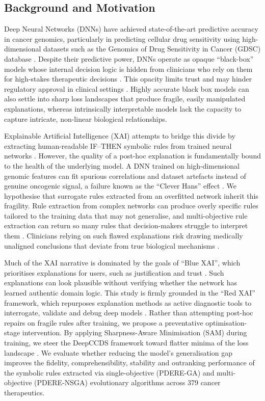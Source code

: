 \subsection{Background and Motivation}\label{sec:background}
Deep Neural Networks (DNNs) have achieved state-of-the-art predictive accuracy in cancer genomics, particularly in predicting cellular drug sensitivity using high-dimensional datasets such as the Genomics of Drug Sensitivity in Cancer (GDSC) database \citep{yang2013,baptista2021}. Despite their predictive power, DNNs operate as opaque ``black-box'' models whose internal decision logic is hidden from clinicians who rely on them for high-stakes therapeutic decisions \citep{samek2017}. This opacity limits trust and may hinder regulatory approval in clinical settings \citep{arrieta2020,klauschen2024}. Highly accurate black box models can also settle into sharp loss landscapes that produce fragile, easily manipulated explanations, whereas intrinsically interpretable models lack the capacity to capture intricate, non-linear biological relationships.

Explainable Artificial Intelligence (XAI) attempts to bridge this divide by extracting human-readable IF--THEN symbolic rules from trained neural networks \citep{yedjour2024}. However, the quality of a post-hoc explanation is fundamentally bound to the health of the underlying model. A DNN trained on high-dimensional genomic features can fit spurious correlations and dataset artefacts instead of genuine oncogenic signal, a failure known as the ``Clever Hans'' effect \citep{lapuschkin2019,anders2022,pahde2023}. We hypothesise that surrogate rules extracted from an overfitted network inherit this fragility. Rule extraction from complex networks can produce overly specific rules tailored to the training data that may not generalise, and multi-objective rule extraction can return so many rules that decision-makers struggle to interpret them \citep{yedjour2024}. Clinicians relying on such flawed explanations risk drawing medically unaligned conclusions that deviate from true biological mechanisms \citep{longo2024}.

Much of the XAI narrative is dominated by the goals of ``Blue XAI'', which prioritises explanations for users, such as justification and trust \citep{biecek2024}. Such explanations can look plausible without verifying whether the network has learned authentic domain logic. This study is firmly grounded in the ``Red XAI'' framework, which repurposes explanation methods as active diagnostic tools to interrogate, validate and debug deep models \citep{biecek2024}. Rather than attempting post-hoc repairs on fragile rules after training, we propose a preventative optimisation-stage intervention. By applying Sharpness-Aware Minimisation (SAM) \citep{foret2021} during training, we steer the DeepCCDS framework toward flatter minima of the loss landscape \citep{foret2021,li2018}. We evaluate whether reducing the model's generalisation gap improves the fidelity, comprehensibility, stability and outranking performance of the symbolic rules extracted via single-objective (PDERE-GA) and multi-objective (PDERE-NSGA) evolutionary algorithms across 379 cancer therapeutics.

